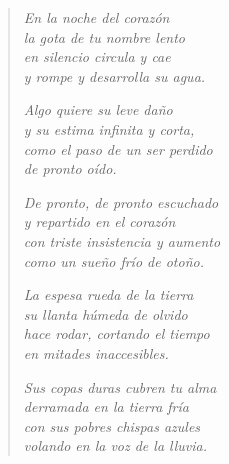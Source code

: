 \documentclass[12pt]{article}
\begin{document}
\clearpage
{}
\begin{verse}

\emph{En la noche del corazón\\
la gota de tu nombre lento\\
en silencio circula y cae\\
y rompe y desarrolla su agua.}  

\emph{Algo quiere su leve daño\\
y su estima infinita y corta,\\
como el paso de un ser perdido\\
de pronto oído.}  

\emph{De pronto, de pronto escuchado\\
y repartido en el corazón\\
con triste insistencia y aumento\\
como un sueño frío de otoño.}  

\emph{La espesa rueda de la tierra\\
su llanta húmeda de olvido\\
hace rodar, cortando el tiempo\\
en mitades inaccesibles.}  

\emph{Sus copas duras cubren tu alma\\
derramada en la tierra fría\\
con sus pobres chispas azules\\
volando en la voz de la lluvia.}
\end{verse}
\end{document}

